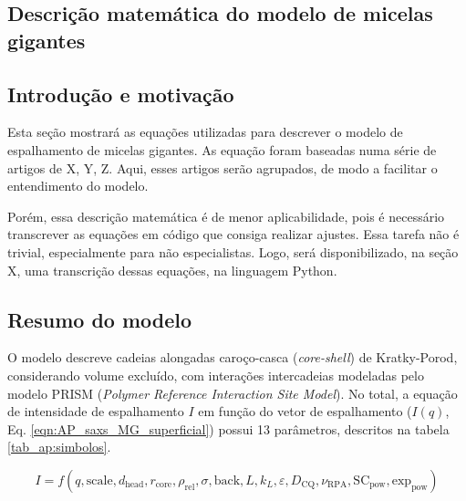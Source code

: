 \begin{apendicesenv}
\partapendices

\chapter{Descrição matemática do modelo de micelas gigantes}
\label{sec:modelo_MG_matematica}
\section{Introdução e motivação}

Esta seção mostrará as equações utilizadas para descrever o modelo de espalhamento de micelas gigantes. As equação foram baseadas numa série de artigos de X, Y, Z. Aqui, esses artigos serão agrupados, de modo a facilitar o entendimento do modelo.

Porém, essa descrição matemática é de menor aplicabilidade, pois é necessário transcrever as equações em código que consiga realizar ajustes. Essa tarefa não é trivial, especialmente para não especialistas. Logo, será disponibilizado, na seção X, uma transcrição dessas equações, na linguagem Python.


\section{Resumo do modelo}

O modelo descreve cadeias alongadas caroço-casca (\emph{core-shell}) de Kratky-Porod, considerando volume excluído, com interações intercadeias modeladas pelo modelo PRISM (\emph{Polymer Reference Interaction Site Model}). No total, a equação de intensidade de espalhamento \(I\) em função do vetor de espalhamento \q (\(I(q)\), Eq. \ref{eqn:AP_saxs_MG_superficial}) possui 13 parâmetros, descritos na tabela \ref{tab_ap:simbolos}.

\begin{equation}
I = f(q, \mathrm{scale}, d_{\mathrm{head}}, r_{\mathrm{core}}, \rho_{\mathrm{rel}}, \sigma, \mathrm{back}, L, k_L, \varepsilon, D_{\mathrm{CQ}}, \nu_{\mathrm{RPA}}, \mathrm{SC}_{\mathrm{pow}}, \mathrm{exp}_{\mathrm{pow}})
\label{eqn:AP_saxs_MG_superficial}
\end{equation}


\end{apendicesenv}
